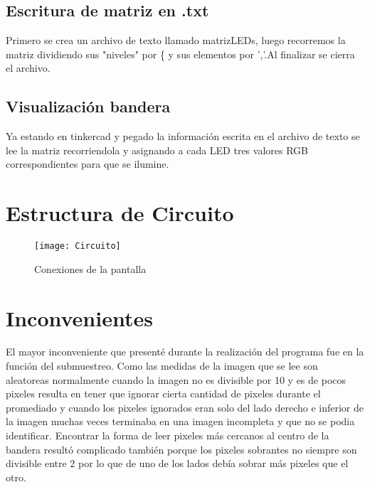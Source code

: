 \documentclass{article}
\begin{document}
    \subsection{Escritura de matriz en .txt}
    Primero se crea un archivo de texto llamado matrizLEDs, luego recorremos la matriz dividiendo sus "niveles" por \{ y sus elementos por ','.Al finalizar se cierra el archivo.
    \subsection{Visualización bandera}
    Ya estando en tinkercad y pegado la información escrita en el archivo de texto se lee la matriz recorriendola y asignando a cada LED tres valores RGB correspondientes para que se ilumine. 


\section{Estructura de Circuito}
\begin{figure}[htb]
    \centering
    \texttt{[image: Circuito]}
    \caption{Conexiones de la pantalla}
    \label{fig:mesh1}
\end{figure}

\section{Inconvenientes}
El mayor inconveniente que presenté durante la realización del programa fue en la función del submuestreo. Como las medidas de la imagen que se lee son aleatoreas normalmente cuando la imagen no es divisible por 10 y es de pocos pixeles resulta en tener que ignorar cierta cantidad de pixeles durante el promediado y cuando los pixeles ignorados eran solo del lado derecho e inferior de la imagen muchas veces terminaba en una imagen incompleta y que no se podia identificar. Encontrar la forma de leer pixeles más cercanos al centro de la bandera resultó complicado también porque los pixeles sobrantes no siempre son divisible entre 2 por lo que de uno de los lados debía sobrar más pixeles que el otro.
\end{document}
